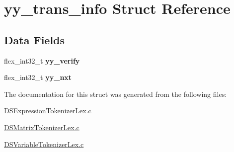 \hypertarget{structyy__trans__info}{
\section{yy\_\-trans\_\-info Struct Reference}
\label{structyy__trans__info}
}
\subsection*{Data Fields}
\begin{DoxyCompactItemize}
\item 
\hypertarget{structyy__trans__info_a5faf5583708f5fa457bc1cb9bab86e38}{
flex\_\-int32\_\-t {\bfseries yy\_\-verify}}
\label{structyy__trans__info_a5faf5583708f5fa457bc1cb9bab86e38}

\item 
\hypertarget{structyy__trans__info_a51bfd9e47041873b7b8075c677d1cfe1}{
flex\_\-int32\_\-t {\bfseries yy\_\-nxt}}
\label{structyy__trans__info_a51bfd9e47041873b7b8075c677d1cfe1}

\end{DoxyCompactItemize}


The documentation for this struct was generated from the following files:\begin{DoxyCompactItemize}
\item 
\hyperlink{_d_s_expression_tokenizer_lex_8c}{DSExpressionTokenizerLex.c}\item 
\hyperlink{_d_s_matrix_tokenizer_lex_8c}{DSMatrixTokenizerLex.c}\item 
\hyperlink{_d_s_variable_tokenizer_lex_8c}{DSVariableTokenizerLex.c}\end{DoxyCompactItemize}
